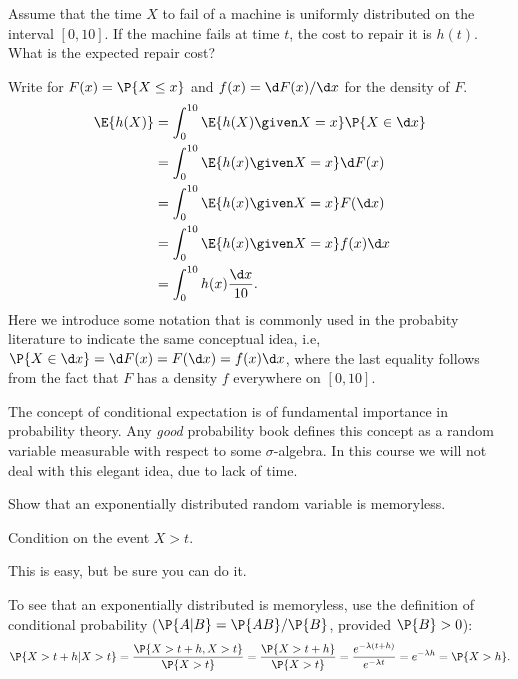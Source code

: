 \begin{question}
  Assume that the time $X$ to fail of a machine is uniformly
  distributed on the interval $[0,10]$. If the machine fails at time
  $t$, the cost to repair it is $h(t)$. What is the expected repair
  cost? 
  \begin{solution}
    Write for $F(x) = \P{X\leq x}$ and $f(x) = \d F(x)/\d x$ for the
    density of $F$.
    \begin{equation*}
      \begin{split}
\E{h(X)}
&= \int_0^{10} \E{h(X) \given X = x} \P{X\in \d x} \\
&= \int_0^{10} \E{h(x) \given X = x} \d F(x) \\
&= \int_0^{10} \E{h(x) \given X = x} F(\d x) \\
&= \int_0^{10} \E{h(x) \given X = x} f(x) \d x \\
&= \int_0^{10} h(x)\frac{\d x}{10}.
      \end{split}
    \end{equation*}
    Here we introduce some notation that is commonly used in the
    probabity literature to indicate the same conceptual idea, i.e,
    $\P{X\in \d x} = \d F(x) = F(\d x) = f(x) \d x$, where the last
    equality follows from the fact that $F$ has a density $f$
    everywhere on $[0,10]$. 

    The concept of conditional expectation is of fundamental
    importance in probability theory. Any \emph{good} probability book
    defines this concept as a random variable measurable with respect
    to some $\sigma$-algebra. In this course we will not deal with
    this elegant idea, due to lack of time. 

  \end{solution}
\end{question}


\begin{question}
  Show that an exponentially distributed random variable is
  memoryless.  
  \begin{hint}
Condition on the event ${X>t}$. 
  \end{hint}
  \begin{solution}
This is easy, but be sure you can do it. 

To see that an exponentially
distributed is memoryless, use the definition of conditional
probability ($\P{A|B} = \P{AB}/\P{B}$, provided $\P{B}>0$):
\begin{equation*}
  \P{X>t+h|X>t} = \frac{\P{X>t+h, X>t}}{\P{X>t}} = \frac{\P{X>t+h}}{\P{X>t}} = \frac{e^{-\lambda(t+h)}}{e^{-\lambda t}} = e^{-\lambda h} = \P{X>h}.
\end{equation*}
  \end{solution}
\end{question}

